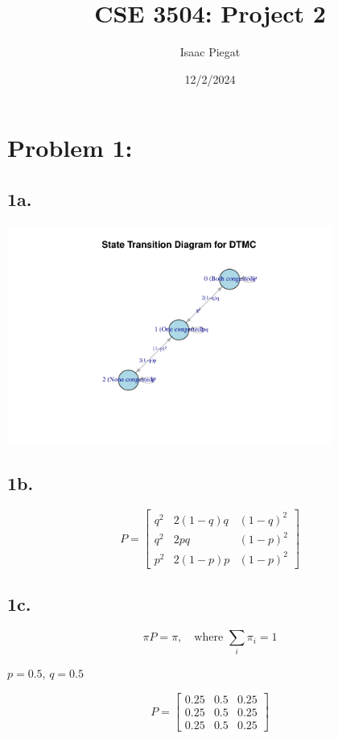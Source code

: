 \documentclass[12pt]{article}
\title{CSE 3504: Project 2}
\author{Isaac Piegat}
\date{12/2/2024}
\begin{document}
\maketitle

\section*{Problem 1:}

\subsection*{1a.}

\begin{center}
    \includegraphics[width=0.8\textwidth]{project2_1a.pdf}
\end{center}

\subsection*{1b.}

\[
P =
\begin{bmatrix}
q^2 & 2(1-q)q & (1-q)^2 \\
q^2 & 2pq & (1-p)^2 \\
p^2 & 2(1-p)p & (1-p)^2
\end{bmatrix}
\]

\subsection*{1c.}

\[
\pi P = \pi, \quad \text{where } \sum_{i} \pi_i = 1
\]

\( p = 0.5 \), \( q = 0.5 \)

\[
P =
\begin{bmatrix}
0.25 & 0.5 & 0.25 \\
0.25 & 0.5 & 0.25 \\
0.25 & 0.5 & 0.25
\end{bmatrix}
\]
\end{document}
